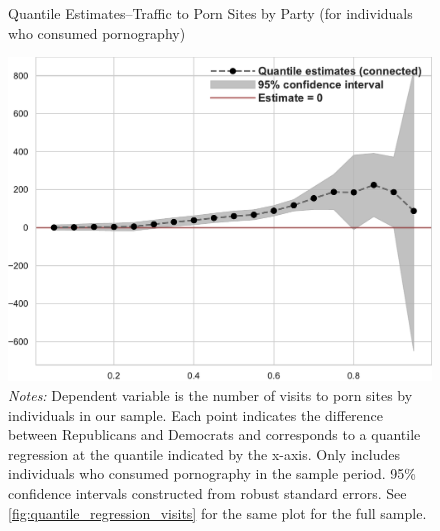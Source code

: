 \documentclass[12pt, letterpaper]{article}
\begin{document}
\begin{figure}
	\centering
	\caption{Quantile Estimates--Traffic to Porn Sites by Party (for individuals who consumed pornography)}
	\includegraphics[width=.55\linewidth]{../figs/quantile_reg_nonzero_visits_adult.pdf}
	\caption*{\footnotesize \emph{Notes:} 
		Dependent variable is the number of visits to porn sites by individuals in our sample.
		Each point indicates the difference between Republicans and Democrats and corresponds to a quantile regression at the quantile indicated by the x-axis.
		Only includes individuals who consumed pornography in the sample period.
		95\% confidence intervals constructed from robust standard errors.
		See \cref{fig:quantile_regression_visits} for the same plot for the full sample.
	}
	\label{fig:quantile_regression_visits_nonzeroes}
\end{figure}
\end{document}
